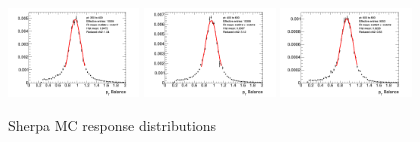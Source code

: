 \begin{figure}[htb!]
    \includegraphics[width=0.31\textwidth]{plots/insitu/fits_sherpa_zmm_nominal/Zmmjet_Nominal_Bin8.png}
    \includegraphics[width=0.31\textwidth]{plots/insitu/fits_sherpa_zmm_nominal/Zmmjet_Nominal_Bin9.png}
    \includegraphics[width=0.31\textwidth]{plots/insitu/fits_sherpa_zmm_nominal/Zmmjet_Nominal_Bin10.png}
    \caption{Sherpa MC \zmmjet response distributions \label{fig:App:zmmsherpafits}}
\end{figure}
